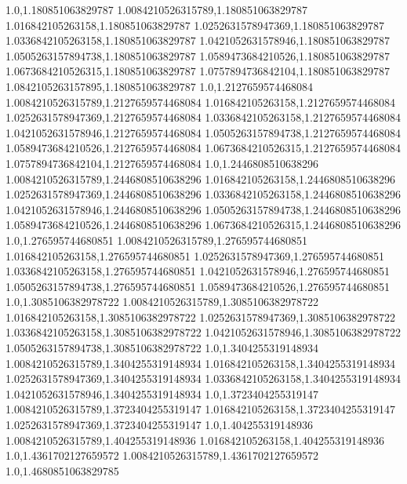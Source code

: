 1.0,1.180851063829787
1.0084210526315789,1.180851063829787
1.016842105263158,1.180851063829787
1.0252631578947369,1.180851063829787
1.0336842105263158,1.180851063829787
1.0421052631578946,1.180851063829787
1.0505263157894738,1.180851063829787
1.0589473684210526,1.180851063829787
1.0673684210526315,1.180851063829787
1.0757894736842104,1.180851063829787
1.0842105263157895,1.180851063829787
1.0,1.2127659574468084
1.0084210526315789,1.2127659574468084
1.016842105263158,1.2127659574468084
1.0252631578947369,1.2127659574468084
1.0336842105263158,1.2127659574468084
1.0421052631578946,1.2127659574468084
1.0505263157894738,1.2127659574468084
1.0589473684210526,1.2127659574468084
1.0673684210526315,1.2127659574468084
1.0757894736842104,1.2127659574468084
1.0,1.2446808510638296
1.0084210526315789,1.2446808510638296
1.016842105263158,1.2446808510638296
1.0252631578947369,1.2446808510638296
1.0336842105263158,1.2446808510638296
1.0421052631578946,1.2446808510638296
1.0505263157894738,1.2446808510638296
1.0589473684210526,1.2446808510638296
1.0673684210526315,1.2446808510638296
1.0,1.276595744680851
1.0084210526315789,1.276595744680851
1.016842105263158,1.276595744680851
1.0252631578947369,1.276595744680851
1.0336842105263158,1.276595744680851
1.0421052631578946,1.276595744680851
1.0505263157894738,1.276595744680851
1.0589473684210526,1.276595744680851
1.0,1.3085106382978722
1.0084210526315789,1.3085106382978722
1.016842105263158,1.3085106382978722
1.0252631578947369,1.3085106382978722
1.0336842105263158,1.3085106382978722
1.0421052631578946,1.3085106382978722
1.0505263157894738,1.3085106382978722
1.0,1.3404255319148934
1.0084210526315789,1.3404255319148934
1.016842105263158,1.3404255319148934
1.0252631578947369,1.3404255319148934
1.0336842105263158,1.3404255319148934
1.0421052631578946,1.3404255319148934
1.0,1.3723404255319147
1.0084210526315789,1.3723404255319147
1.016842105263158,1.3723404255319147
1.0252631578947369,1.3723404255319147
1.0,1.404255319148936
1.0084210526315789,1.404255319148936
1.016842105263158,1.404255319148936
1.0,1.4361702127659572
1.0084210526315789,1.4361702127659572
1.0,1.4680851063829785
